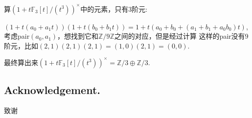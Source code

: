 算$(1+t \mathbb{F}_3[t]/(t^3))^{\times}$中的元素，只有$3$阶元:

$(1+t(a_0+a_1t))(1+t(b_0+b_1t))=1+t(a_0+b_0+(a_1+b_1+a_0b_0)t)$,
考虑pair$(a_0,a_1)$，想找到它和$\mathbb{Z}/9 \mathbb{Z}$之间的对应，但是经过计算
这样的pair没有$9$阶元，比如$(2,1)(2,1)(2,1)=(1,0)(2,1)=(0,0)$.

最终算出来$(1+t \mathbb{F}_3[t]/(t^3))^{\times} = \mathbb{Z}/3 \oplus \mathbb{Z}/3$.


\subsection*{Acknowledgement.}
致谢